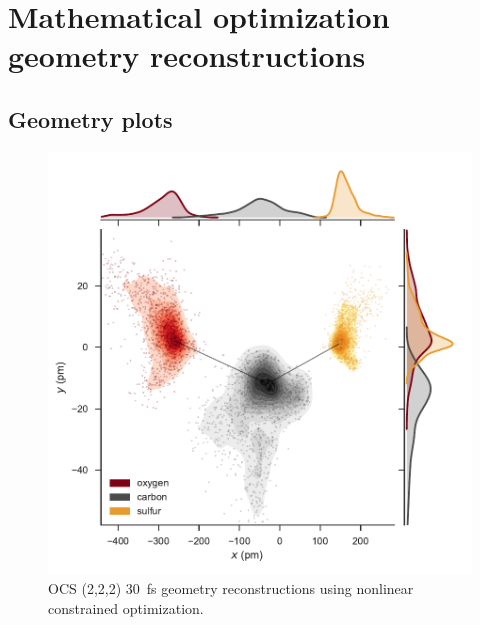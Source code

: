 \section{Mathematical optimization geometry reconstructions}

\subsection{Geometry plots}

\begin{figure}[H]
  \centering
  \includegraphics[width=\textwidth]{Plots/OCS22230fsMOGeometry}
  \caption[OCS (2,2,2) \SI{30}{\fs} geometry reconstructions using nonlinear constrained optimization.]
  {OCS (2,2,2) \SI{30}{\fs} geometry reconstructions using nonlinear constrained optimization.}
  \label{fig:OCS22230fsMOGeometry}
\end{figure}

